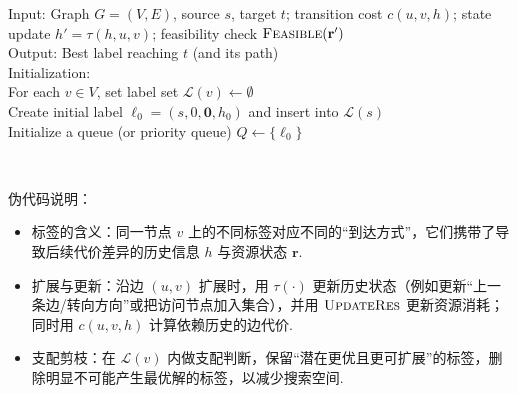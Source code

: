 \begin{algorithm}[H]
  \SetAlgoLined
  \caption{Labeling Algorithm for Path-Dependent Shortest Path}
  \label{algo:pdsp_labeling}

  Input: Graph $G=(V,E)$, source $s$, target $t$; transition cost $c(u,v,h)$; state update $h'\!=\!\tau(h,u,v)$; feasibility check $\textsc{Feasible}(\mathbf{r}')$\\
  Output: Best label reaching $t$ (and its path)\\

  Initialization:\\
  For each $v\in V$, set label set $\mathcal{L}(v) \leftarrow \emptyset$\\
  Create initial label $\ell_0=(s,0,\mathbf{0},h_0)$ and insert into $\mathcal{L}(s)$\\
  Initialize a queue (or priority queue) $Q\leftarrow\{\ell_0\}$\\


  \\
\end{algorithm}

伪代码说明：
\begin{itemize}
  \item 标签的含义：同一节点 $v$ 上的不同标签对应不同的“到达方式”，它们携带了导致后续代价差异的历史信息 $h$ 与资源状态 $\mathbf{r}$.
  \item 扩展与更新：沿边 $(u,v)$ 扩展时，用 $\tau(\cdot)$ 更新历史状态（例如更新“上一条边/转向方向”或把访问节点加入集合），并用 $\textsc{UpdateRes}$ 更新资源消耗；同时用 $c(u,v,h)$ 计算依赖历史的边代价.
  \item 支配剪枝：在 $\mathcal{L}(v)$ 内做支配判断，保留“潜在更优且更可扩展”的标签，删除明显不可能产生最优解的标签，以减少搜索空间.
\end{itemize}

